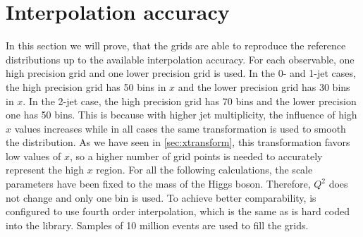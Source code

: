 \section{Interpolation accuracy}
In this section we will prove, that the grids are able to reproduce the reference distributions up to the available interpolation accuracy.
For each observable, one high precision grid and one lower precision grid is used.
In the 0- and 1-jet cases, the high precision grid has \num{50} bins in $x$ and the lower precision grid has \num{30} bins in $x$.
In the 2-jet case, the high precision grid has \num{70} bins and the lower precision one has \num{50} bins.
This is because with higher jet multiplicity, the influence of high $x$ values increases while in all cases the same transformation is used to smooth the distribution.
As we have seen in \cref{sec:xtransform}, this transformation favors low values of $x$, so a higher number of grid points is needed to accurately represent the high $x$ region.
For all the following calculations, the scale parameters have been fixed to the mass of the Higgs boson.
Therefore, $Q^2$ does not change and only one bin is used.
To achieve better comparability, \appl{} is configured to use fourth order interpolation, which is the same as is hard coded into the \fnlo{} library.
Samples of \num{10} million events are used to fill the grids.

